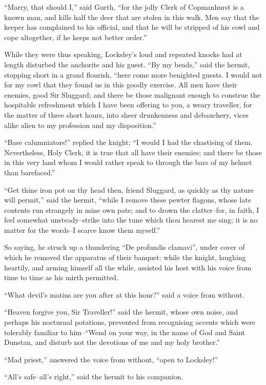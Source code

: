 ``Marry, that should I,'' said Gurth, ``for the jolly Clerk of
Copmanhurst is a known man, and kills half the deer that are stolen in
this walk. Men say that the keeper has complained to his official, and
that he will be stripped of his cowl and cope altogether, if he keeps
not better order.''

While they were thus speaking, Locksley's loud and repeated knocks had
at length disturbed the anchorite and his guest. ``By my beads,'' said
the hermit, stopping short in a grand flourish, ``here come more
benighted guests. I would not for my cowl that they found us in this
goodly exercise. All men have their enemies, good Sir Sluggard; and
there be those malignant enough to construe the hospitable refreshment
which I have been offering to you, a weary traveller, for the matter of
three short hours, into sheer drunkenness and debauchery, vices alike
alien to my profession and my disposition.''

``Base calumniators!'' replied the knight; ``I would I had the
chastising of them. Nevertheless, Holy Clerk, it is true that all have
their enemies; and there be those in this very land whom I would rather
speak to through the bars of my helmet than barefaced.''

``Get thine iron pot on thy head then, friend Sluggard, as quickly as
thy nature will permit,'' said the hermit, ``while I remove these pewter
flagons, whose late contents run strangely in mine own pate; and to
drown the clatter--for, in faith, I feel somewhat unsteady--strike into
the tune which thou hearest me sing; it is no matter for the words--I
scarce know them myself.''

So saying, he struck up a thundering ``De profundis clamavi'', under
cover of which he removed the apparatus of their banquet: while the
knight, laughing heartily, and arming himself all the while, assisted
his host with his voice from time to time as his mirth permitted.

``What devil's matins are you after at this hour?'' said a voice from
without.

``Heaven forgive you, Sir Traveller!'' said the hermit, whose own noise,
and perhaps his nocturnal potations, prevented from recognising accents
which were tolerably familiar to him--``Wend on your way, in the name of
God and Saint Dunstan, and disturb not the devotions of me and my holy
brother.''

``Mad priest,'' answered the voice from without, ``open to Locksley!''

``All's safe--all's right,'' said the hermit to his companion.

